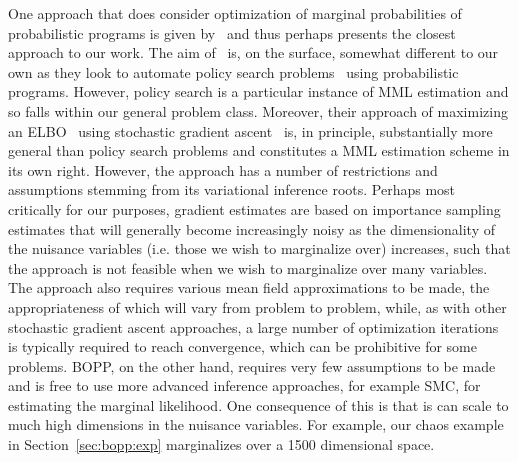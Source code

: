 One approach that does consider optimization of marginal probabilities of probabilistic
programs is given by~\cite{vandemeent2016black} and thus perhaps presents the closest
approach to our work.  The aim of~\cite{vandemeent2016black} is, on the surface, somewhat
different to our own as they look to automate policy search problems~\citep{deisenroth2013survey}
using probabilistic programs.  However, policy search is a particular instance of MML estimation
and so falls within our general problem class.  Moreover, their approach of maximizing an ELBO~\citep{blei2016variational}
using stochastic gradient ascent~\citep{robbins1951stochastic} is, in principle, substantially
more general than policy search problems and constitutes a MML estimation scheme in its own right.
However, the approach has a number of restrictions and assumptions stemming from its variational 
inference roots.  Perhaps most critically for our purposes, gradient estimates are based on importance
sampling estimates that will generally become increasingly noisy as the dimensionality of the nuisance
variables (i.e. those we wish to marginalize over) increases, such that the approach is not feasible
when we wish to marginalize over many variables.  The approach also requires various mean field approximations
to be made, the appropriateness of which will vary from problem to problem, while, as with other
stochastic gradient ascent approaches, a large number of optimization iterations is typically required
to reach convergence, which can be prohibitive for some problems.  BOPP, on the other hand, requires
very few assumptions to be made and is free to use more advanced inference approaches, for example
SMC, for estimating the marginal likelihood.  One consequence of this is that is can scale to much
high dimensions in the nuisance variables.  For example, our chaos example in Section~\ref{sec:bopp:exp}
marginalizes over a 1500 dimensional space.

